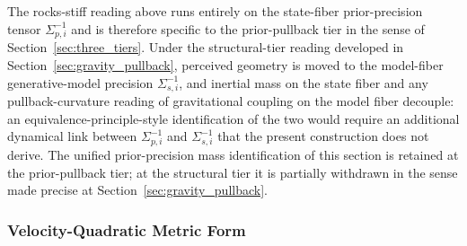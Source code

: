 \documentclass[11pt]{article}
\begin{document}
The rocks-stiff reading above runs entirely on the state-fiber prior-precision tensor $\Sigma_{p,i}^{-1}$ and is therefore specific to the prior-pullback tier in the sense of Section~\ref{sec:three_tiers}. Under the structural-tier reading developed in Section~\ref{sec:gravity_pullback}, perceived geometry is moved to the model-fiber generative-model precision $\Sigma_{s,i}^{-1}$, and inertial mass on the state fiber and any pullback-curvature reading of gravitational coupling on the model fiber decouple: an equivalence-principle-style identification of the two would require an additional dynamical link between $\Sigma_{p,i}^{-1}$ and $\Sigma_{s,i}^{-1}$ that the present construction does not derive. The unified prior-precision mass identification of this section is retained at the prior-pullback tier; at the structural tier it is partially withdrawn in the sense made precise at Section~\ref{sec:gravity_pullback}.

\subsubsection{Velocity-Quadratic Metric Form}
\label{sec:velocity_quadratic}
\end{document}

